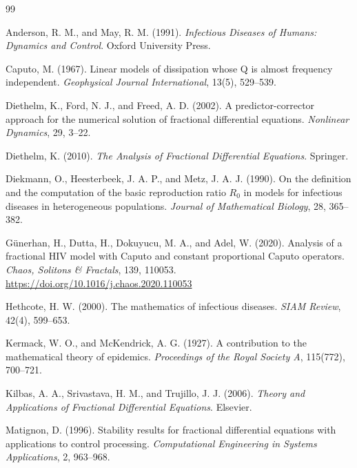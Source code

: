 \documentclass[12pt,a4paper,oneside]{report}
\begin{document}
\begin{thebibliography}{99}

Anderson, R. M., and May, R. M. (1991).
\textit{Infectious Diseases of Humans: Dynamics and Control}.
Oxford University Press.

Caputo, M. (1967).
Linear models of dissipation whose Q is almost frequency independent.
\textit{Geophysical Journal International}, 13(5), 529--539.

Diethelm, K., Ford, N. J., and Freed, A. D. (2002).
A predictor-corrector approach for the numerical solution of fractional differential equations.
\textit{Nonlinear Dynamics}, 29, 3--22.

Diethelm, K. (2010).
\textit{The Analysis of Fractional Differential Equations}.
Springer.

Diekmann, O., Heesterbeek, J. A. P., and Metz, J. A. J. (1990).
On the definition and the computation of the basic reproduction ratio $R_0$ in models for infectious diseases in heterogeneous populations.
\textit{Journal of Mathematical Biology}, 28, 365--382.

Günerhan, H., Dutta, H., Dokuyucu, M. A., and Adel, W. (2020).
Analysis of a fractional HIV model with Caputo and constant proportional Caputo operators.
\textit{Chaos, Solitons \& Fractals}, 139, 110053.
\url{https://doi.org/10.1016/j.chaos.2020.110053}

Hethcote, H. W. (2000).
The mathematics of infectious diseases.
\textit{SIAM Review}, 42(4), 599--653.

Kermack, W. O., and McKendrick, A. G. (1927).
A contribution to the mathematical theory of epidemics.
\textit{Proceedings of the Royal Society A}, 115(772), 700--721.

Kilbas, A. A., Srivastava, H. M., and Trujillo, J. J. (2006).
\textit{Theory and Applications of Fractional Differential Equations}.
Elsevier.

Matignon, D. (1996).
Stability results for fractional differential equations with applications to control processing.
\textit{Computational Engineering in Systems Applications}, 2, 963--968.


\end{thebibliography}
\end{document}

